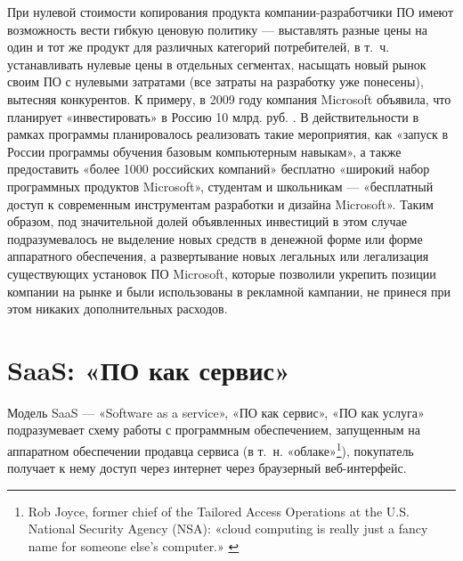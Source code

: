 \documentclass{article}
\begin{document}
При нулевой стоимости копирования продукта компании-разработчики ПО имеют возможность вести гибкую ценовую политику — выставлять разные цены на один и тот же продукт для различных категорий потребителей, в т.~ч. устанавливать нулевые цены в отдельных сегментах, насыщать новый рынок своим ПО с нулевыми затратами (все затраты на разработку уже понесены), вытесняя конкурентов. К примеру, в 2009 году компания Microsoft объявила, что планирует «инвестировать» в Россию 10 млрд. руб. \cite{microsoftInvestsRF}. В действительности в рамках программы планировалось реализовать такие мероприятия, как «запуск в России программы обучения базовым компьютерным навыкам», а также предоставить «более 1000 российских компаний» бесплатно «широкий набор программных продуктов Microsoft», студентам и школьникам — «бесплатный доступ к современным инструментам разработки и дизайна Microsoft». Таким образом, под значительной долей объявленных инвестиций в этом случае подразумевалось не выделение новых средств в денежной форме или форме аппаратного обеспечения, а развертывание новых легальных или легализация существующих установок ПО Microsoft, которые позволили укрепить позиции компании на рынке и были использованы в рекламной кампании, не принеся при этом никаких дополнительных расходов.

\section*{SaaS: «ПО как сервис»}

Модель SaaS — «Software as a service», «ПО как сервис», «ПО как услуга» подразумевает схему работы с программным обеспечением, запущенным на аппаратном обеспечении продавца сервиса (в т.~н. «облаке»\footnote{Rob Joyce, former chief of the Tailored Access Operations at the U.S. National Security Agency (NSA): «cloud computing is really just a fancy name for someone else’s computer.» \cite{cloudIsAFancyName}}), покупатель получает к нему доступ через интернет через браузерный веб-интерфейс.
\end{document}
